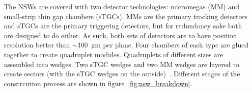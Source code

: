 The NSWs are covered with two detector technologies: micromegas (MM) and small-strip thin gap chambers (sTGCs). MMs are the primary tracking detectors and sTGCs are the primary triggering detectors, but for redundancy sake both are designed to do either. As such, both sets of detectors are to have position resolution better than $\sim$\SI{100}{\micro\meter} per plane. Four chambers of each type are glued together to create quadruplet modules. Quadruplets of different sizes are assembled into wedges. Two sTGC wedges and two MM wedges are layered to create sectors (with the sTGC wedges on the outside)~\cite{nsw_tdr}. Different stages of the constrcution process are shown in figure~\ref{fig:nsw_breakdown}.%
\newpage
\thispagestyle{empty}
